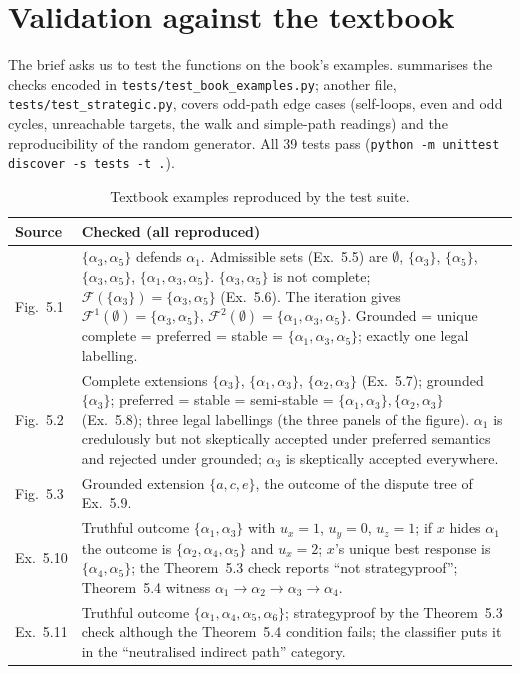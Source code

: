 \documentclass[11pt,a4paper]{article}
\newcommand{\code}[1]{{\let\origus\_\renewcommand{\_}{\origus\allowbreak}\texttt{#1}}}
\theoremstyle{definition}
\begin{document}
\section{Validation against the textbook}\label{sec:validation}

The brief asks us to test the functions on the book's examples.  summarises the checks
encoded in \code{tests/test\_book\_examples.py}; another file, \code{tests/test\_strategic.py}, covers
odd-path edge cases (self-loops, even and odd cycles, unreachable targets, the walk and simple-path
readings) and the reproducibility of the random generator. All 39 tests pass
(\code{python -m unittest discover -s tests -t .}).

\begin{table}[H]
\centering\small
\begin{tabularx}{\textwidth}{@{}lX@{}}
\toprule
Source & Checked (all reproduced) \\
\midrule
Fig.~5.1 & $\{\alpha_3,\alpha_5\}$ defends $\alpha_1$. Admissible sets (Ex.~5.5) are $\emptyset$,
  $\{\alpha_3\}$, $\{\alpha_5\}$, $\{\alpha_3,\alpha_5\}$, $\{\alpha_1,\alpha_3,\alpha_5\}$.
  $\{\alpha_3,\alpha_5\}$ is not complete; $\mathcal F(\{\alpha_3\})=\{\alpha_3,\alpha_5\}$ (Ex.~5.6).
  The iteration gives $\mathcal F^1(\emptyset)=\{\alpha_3,\alpha_5\}$,
  $\mathcal F^2(\emptyset)=\{\alpha_1,\alpha_3,\alpha_5\}$. Grounded = unique complete = preferred =
  stable = $\{\alpha_1,\alpha_3,\alpha_5\}$; exactly one legal labelling. \\
Fig.~5.2 & Complete extensions $\{\alpha_3\}$, $\{\alpha_1,\alpha_3\}$, $\{\alpha_2,\alpha_3\}$
  (Ex.~5.7); grounded $\{\alpha_3\}$; preferred = stable = semi-stable =
  $\{\alpha_1,\alpha_3\},\{\alpha_2,\alpha_3\}$ (Ex.~5.8); three legal labellings (the three panels of
  the figure). $\alpha_1$ is credulously but not skeptically accepted under preferred semantics and
  rejected under grounded; $\alpha_3$ is skeptically accepted everywhere. \\
Fig.~5.3 & Grounded extension $\{a,c,e\}$, the outcome of the dispute tree of Ex.~5.9. \\
Ex.~5.10 & Truthful outcome $\{\alpha_1,\alpha_3\}$ with $u_x=1$, $u_y=0$, $u_z=1$; if $x$ hides
  $\alpha_1$ the outcome is $\{\alpha_2,\alpha_4,\alpha_5\}$ and $u_x=2$; $x$'s unique best response is
  $\{\alpha_4,\alpha_5\}$; the Theorem~5.3 check reports ``not strategyproof''; Theorem~5.4 witness
  $\alpha_1\to\alpha_2\to\alpha_3\to\alpha_4$. \\
Ex.~5.11 & Truthful outcome $\{\alpha_1,\alpha_4,\alpha_5,\alpha_6\}$; strategyproof by the
  Theorem~5.3 check although the Theorem~5.4 condition fails; the classifier puts it in the
  ``neutralised indirect path'' category. \\
\bottomrule
\end{tabularx}
\caption{Textbook examples reproduced by the test suite.}\label{tab:book}
\end{table}
\end{document}
